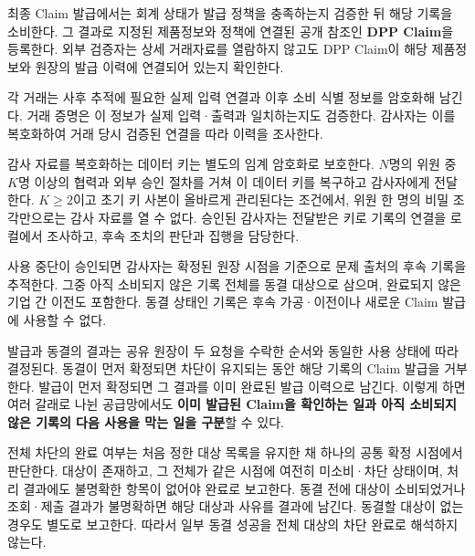 최종 Claim 발급에서는 회계 상태가 발급 정책을 충족하는지 검증한 뒤 해당 기록을 소비한다.
그 결과로 지정된 제품정보와 정책에 연결된 공개 참조인 \textbf{DPP Claim}을 등록한다.
외부 검증자는 상세 거래자료를 열람하지 않고도 DPP Claim이 해당 제품정보와 원장의 발급 이력에 연결되어 있는지 확인한다.

각 거래는 사후 추적에 필요한 실제 입력 연결과 이후 소비 식별 정보를 암호화해 남긴다.
거래 증명은 이 정보가 실제 입력·출력과 일치하는지도 검증한다.
감사자는 이를 복호화하여 거래 당시 검증된 연결을 따라 이력을 조사한다.

감사 자료를 복호화하는 데이터 키는 별도의 임계 암호화로 보호한다.
$N$명의 위원 중 $K$명 이상의 협력과 외부 승인 절차를 거쳐 이 데이터 키를 복구하고 감사자에게 전달한다.
$K\ge2$이고 초기 키 사본이 올바르게 관리된다는 조건에서, 위원 한 명의 비밀 조각만으로는 감사 자료를 열 수 없다.
승인된 감사자는 전달받은 키로 기록의 연결을 로컬에서 조사하고, 후속 조치의 판단과 집행을 담당한다.

사용 중단이 승인되면 감사자는 확정된 원장 시점을 기준으로 문제 출처의 후속 기록을 추적한다.
그중 아직 소비되지 않은 기록 전체를 동결 대상으로 삼으며, 완료되지 않은 기업 간 이전도 포함한다.
동결 상태인 기록은 후속 가공·이전이나 새로운 Claim 발급에 사용할 수 없다.

발급과 동결의 결과는 공유 원장이 두 요청을 수락한 순서와 동일한 사용 상태에 따라 결정된다.
동결이 먼저 확정되면 차단이 유지되는 동안 해당 기록의 Claim 발급을 거부한다.
발급이 먼저 확정되면 그 결과를 이미 완료된 발급 이력으로 남긴다.
이렇게 하면 여러 갈래로 나뉜 공급망에서도 \textbf{이미 발급된 Claim을 확인하는 일과 아직 소비되지 않은 기록의 다음 사용을 막는 일을 구분}할 수 있다.

전체 차단의 완료 여부는 처음 정한 대상 목록을 유지한 채 하나의 공통 확정 시점에서 판단한다.
대상이 존재하고, 그 전체가 같은 시점에 여전히 미소비·차단 상태이며, 처리 결과에도 불명확한 항목이 없어야 완료로 보고한다.
동결 전에 대상이 소비되었거나 조회·제출 결과가 불명확하면 해당 대상과 사유를 결과에 남긴다.
동결할 대상이 없는 경우도 별도로 보고한다.
따라서 일부 동결 성공을 전체 대상의 차단 완료로 해석하지 않는다.

